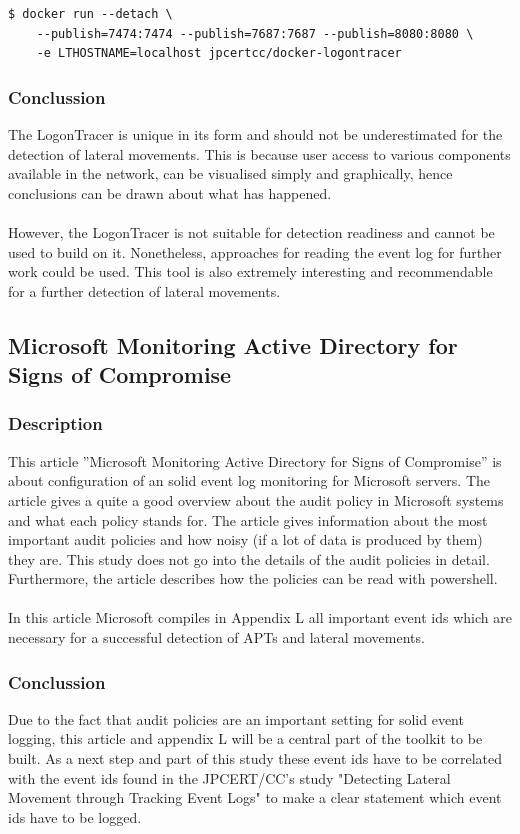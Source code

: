 \begin{lstlisting}[language=HTML,caption=LogonTracer: recommended docker run command]
    $ docker run --detach \
    --publish=7474:7474 --publish=7687:7687 --publish=8080:8080 \
    -e LTHOSTNAME=localhost jpcertcc/docker-logontracer
\end{lstlisting}
\subsubsection{Conclussion}
The LogonTracer is unique in its form and should not be underestimated for the detection of lateral movements. This is because user access to various components available in the network, can be visualised simply and graphically, hence conclusions can be drawn about what has happened.
\\\\
However, the LogonTracer is not suitable for detection readiness and cannot be used to build on it. Nonetheless, approaches for reading the event log for further work could be used. This tool is also extremely interesting and recommendable for a further detection of lateral movements.

\clearpage

\subsection{Microsoft Monitoring Active Directory for Signs of Compromise}
\subsubsection{Description}
This article ''Microsoft Monitoring Active Directory for Signs of Compromise'' \cite{MSADSignsOfCompromise} is about configuration of an solid event log monitoring for Microsoft servers. The article gives a quite a good overview about the audit policy in Microsoft systems and what each policy stands for. The article gives information about the most important audit policies and how noisy (if a lot of data is produced by them) they are. This study does not go into the details of the audit policies in detail. Furthermore, the article describes how the policies can be read with powershell.
\\\\
In this article Microsoft compiles in Appendix L \cite{MSAppendixL} all important event ids which are necessary for a successful detection of APTs and lateral movements.

\subsubsection{Conclussion}
Due to the fact that audit policies are an important setting for solid event logging, this article and appendix L will be a central part of the toolkit to be built. As a next step and part of this study these event ids have to be correlated with the event ids found in the JPCERT/CC's study "Detecting Lateral Movement through Tracking Event Logs" \cite{JPCERTDetectingLateralMovement} to make a clear statement which event ids have to be logged.

